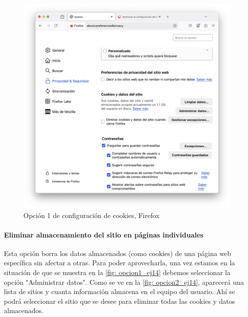 \begin{figure}[H]   
    \includegraphics[width=\textwidth]{opcion1_ej14.png}
    \caption{Opción 1 de configuración de cookies, Firefox}
    \label{fig:opcion1_ej14}
\end{figure}


\paragraph{Eliminar almacenamiento del sitio en páginas individuales }

Esta opción borra los datos almacenados (como cookies) de una página web específica sin afectar a otras. Para poder aprovecharla, una vez estamos en la situación de que se muestra en la \ref{fig: opcion1_ej14} debemos seleccionar la opción "Administrar datos". Como se ve en la \ref{fig: opcion2_ej14}, aparecerá una lista de sitios y cuanta información almacena en el equipo del usuario. Ahí se podrá seleccionar el sitio que se desee para eliminar todas las cookies y datos almacenados. 

